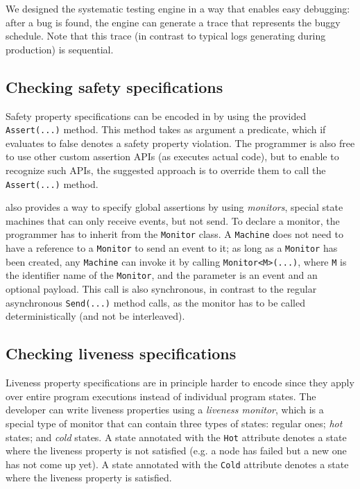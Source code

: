 We designed the systematic testing engine in a way that enables easy debugging: after a bug is found, the engine can generate a trace that represents the buggy schedule. Note that this trace (in contrast to typical logs generating during production) is sequential.

\subsection{Checking safety specifications}
\label{sec:psharp:safety}

Safety property specifications can be encoded in \psharp by using the provided \texttt{Assert(...)} method. This method takes as argument a predicate, which if evaluates to false denotes a safety property violation. The programmer is also free to use other custom assertion APIs (as \psharp executes actual code), but to enable \psharp to recognize such APIs, the suggested approach is to override them to call the \psharp \texttt{Assert(...)} method.

\psharp also provides a way to specify global assertions by using \emph{monitors}, special state machines that
can only receive events, but not send. To declare a monitor, the programmer has to inherit from the \psharp \texttt{Monitor} class. A \texttt{Machine} does not need to have a reference to a \texttt{Monitor} to send an event to it; as long as a \texttt{Monitor} has been created, any \texttt{Machine} can invoke it by calling \texttt{Monitor<M>(...)}, where \texttt{M} is the identifier name of the \texttt{Monitor}, and the parameter is an event and an optional payload. This call is also synchronous, in contrast to the regular asynchronous \texttt{Send(...)} method calls, as the monitor has to be called deterministically (and not be interleaved).

\subsection{Checking liveness specifications}
\label{sec:psharp:liveness}

Liveness property specifications are in principle harder to encode since they apply over entire program executions instead of individual program states. The \psharp developer can write liveness properties using a \emph{liveness monitor}, which is a special type of monitor that can contain three types of states: regular ones; \emph{hot} states; and \emph{cold} states. A state annotated with the \texttt{Hot} attribute denotes a state where the liveness property is not satisfied (e.g. a node has failed but a new one has not come up yet). A state annotated with the \texttt{Cold} attribute denotes a state where the liveness property is satisfied.

